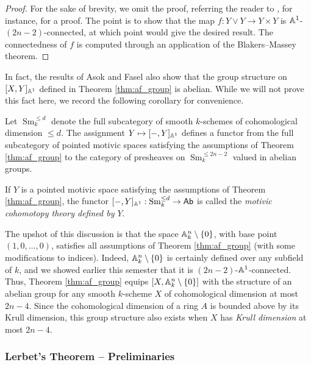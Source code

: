 \begin{proof}
    For the sake of brevity, we omit the proof, referring the reader to \cite[Proposition 4.1]{LERBET2024109415}, for instance, for a proof. The point is to show that the map $f: Y \vee Y \to Y \times Y$ is $\mathbb{A}^1$-$(2n-2)$-connected, at which point \cite[Lemma 2.22]{LERBET2024109415} would give the desired result. The connectedness of $f$ is computed through an application of the Blakers--Massey theorem.
\end{proof}

In fact, the results of Asok and Fasel \cite[Proposition 1.2.5]{AF22} also show that the group structure on $[X,Y]_{\mathbb{A}^1}$ defined in Theorem \ref{thm:af_group} is abelian. While we will not prove this fact here, we record the following corollary for convenience.

\begin{corollary}
    Let $\operatorname{Sm}_k^{\leq d}$ denote the full subcategory of smooth $k$-schemes of cohomological dimension $\leq d$. The assignment $Y \mapsto [-,Y]_{\mathbb{A}^1}$ defines a functor from the full subcategory of pointed motivic spaces satisfying the assumptions of Theorem \ref{thm:af_group} to the category of presheaves on $\operatorname{Sm}_k^{\leq 2n-2}$ valued in abelian groups. 
\end{corollary}

\begin{remark}
    If $Y$ is a pointed motivic space satisfying the assumptions of Theorem \ref{thm:af_group}, the functor $[-,Y]_{\mathbb{A}^1}: \operatorname{Sm}_k^{\leq d} \to \mathsf{Ab}$ is called the \textit{motivic cohomotopy theory defined by $Y$}.
\end{remark}

The upshot of this discussion is that the space $\mathbb{A}^n_k\setminus\{0\}$, with base point $(1,0,\ldots,0)$, satisfies all assumptions of Theorem \ref{thm:af_group} (with some modifications to indices). Indeed, $\mathbb{A}^n_k\setminus\{0\}$ is certainly defined over any subfield of $k$, and we showed earlier this semester that it is $(2n-2)$-$\mathbb{A}^1$-connected. Thus, Theorem \ref{thm:af_group} equips $[X,\mathbb{A}^n_k\setminus\{0\}]$ with the structure of an abelian group for any smooth $k$-scheme $X$ of cohomological dimension at most $2n-4$. Since the cohomological dimension of a ring $A$ is bounded above by its Krull dimension, this group structure also exists when $X$ has \textit{Krull dimension} at most $2n-4$.

\subsubsection{Lerbet's Theorem -- Preliminaries}

